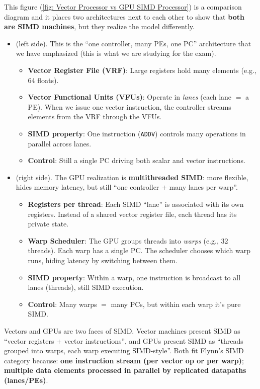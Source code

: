 \noindent
This figure (\ref{fig: Vector Processor vs GPU SIMD Processor}) is a comparison diagram and it places two architectures next to each other to show that \textbf{both are SIMD machines}, but they realize the model differently.
\begin{itemize}
    \item {} (left side). This is the ``one controller, many PEs, one PC'' architecture that we have emphasized (this is what we are studying for the exam).
    \begin{itemize}
        \item \textbf{Vector Register File (VRF)}: Large registers hold many elements (e.g., 64 floats).
        \item \textbf{Vector Functional Units (VFUs)}: Operate in \emph{lanes} (each lane $=$ a PE). When we issue one vector instruction, the controller streams elements from the VRF through the VFUs.
        \item \textbf{SIMD property}: One instruction (\texttt{ADDV}) controls many operations in parallel across lanes.
        \item \textbf{Control}: Still a single PC driving both scalar and vector instructions.
    \end{itemize}
    \item {} (right side). The GPU realization is \textbf{multithreaded SIMD}: more flexible, hides memory latency, but still ``one controller $+$ many lanes per warp''.
    \begin{itemize}
        \item \textbf{Registers per thread}: Each SIMD ``lane'' is associated with its own registers. Instead of a shared vector register file, each thread has its private state.
        \item \textbf{Warp Scheduler}: The GPU groups threads into \emph{warps} (e.g., 32 threads). Each warp has a single PC. The scheduler chooses which warp runs, hiding latency by switching between them.
        \item \textbf{SIMD property}: Within a warp, one instruction is broadcast to all lanes (threads), still SIMD execution.
        \item \textbf{Control}: Many warps $=$ many PCs, but within each warp it's pure SIMD.
    \end{itemize}
\end{itemize}
Vectors and GPUs are two faces of SIMD. Vector machines present SIMD as ``vector registers $+$ vector instructions'', and GPUs present SIMD as ``threads grouped into warps, each warp executing SIMD-style''. Both fit Flynn's SIMD category because: \textbf{one instruction stream (per vector op or per warp)}; \textbf{multiple data elements processed in parallel by replicated datapaths (lanes/PEs)}.